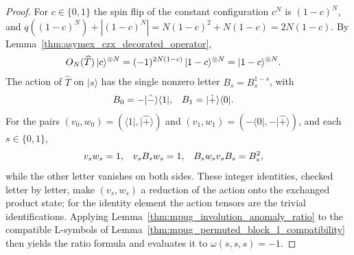 \begin{proof}
    \leanok
    For $c\in\{0,1\}$ the spin flip of the constant configuration $c^N$ is
    $(1-c)^N$, and $q((1-c)^N)+|(1-c)^N|=N(1-c)^2+N(1-c)=2N(1-c)$. By
    Lemma~\ref{thm:asymex_czx_decorated_operator},
    \begin{align}
        O_N(\widehat T)\,|c\rangle^{\otimes N}
         & =(-1)^{2N(1-c)}\,|1-c\rangle^{\otimes N}
        =|1-c\rangle^{\otimes N}.
        \notag
    \end{align}
    The action of $\widehat T$ on $|s\rangle$ has the single nonzero letter
    $B_s=B_s^{1-s}$, with
    \begin{align}
        B_0 & =-|\hat-\rangle\langle1|,
            &
        B_1 & =|\hat+\rangle\langle0|.
        \notag
    \end{align}
    For the pairs $(v_0,w_0)=(\langle1|,|\hat+\rangle)$ and
    $(v_1,w_1)=(-\langle0|,-|\hat+\rangle)$, and each $s\in\{0,1\}$,
    \begin{align}
        v_sw_s       & =1,
                     &
        v_sB_sw_s    & =1,
                     &
        B_sw_sv_sB_s & =B_s^2,
        \notag
    \end{align}
    while the other letter vanishes on both sides. These integer identities,
    checked letter by letter, make $(v_s,w_s)$ a reduction of the action onto
    the exchanged product state; for the identity element the action
    tensors are the trivial identifications. Applying
    Lemma~\ref{thm:mpug_involution_anomaly_ratio} to the compatible
    L-symbols of Lemma~\ref{thm:mpug_permuted_block_l_compatibility}
    then yields the ratio formula and evaluates it to $\omega(s,s,s)=-1$.
\end{proof}

